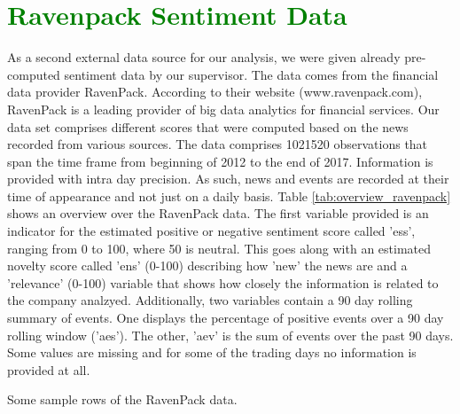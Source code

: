 \section{\textcolor{green}{Ravenpack Sentiment Data}}
As a second external data source for our analysis, we were given already pre-computed sentiment data by our supervisor. The data comes from the financial data provider RavenPack. According to their website (www.ravenpack.com), RavenPack is a leading provider of big data analytics for financial services\nocite{RavenPack}. Our data set comprises different scores that were computed based on the news recorded from various sources. The data comprises 1021520 observations that span the time frame from beginning of 2012 to the end of 2017. Information is provided with intra day precision. As such, news and events are recorded at their time of appearance and not just on a daily basis. Table \ref{tab:overview_ravenpack} shows an overview over the RavenPack data. The first variable provided is an indicator for the estimated positive or negative sentiment score called 'ess', ranging from 0 to 100, where 50 is neutral. This goes along with an estimated novelty score called 'ens' (0-100) describing how 'new' the news are and a 'relevance' (0-100) variable that shows how closely the information is related to the company analzyed. Additionally, two variables contain a 90 day rolling summary of events. One displays the percentage of positive events over a 90 day rolling window ('aes'). The other, 'aev' is the sum of events over the past 90 days. Some values are missing and for some of the trading days no information is provided at all. 
\begin{table}[h!]
    \centering
    \small
    
    \caption{Some sample rows of the RavenPack data.}
    \label{tab:overview_ravenpack}
\end{table}
